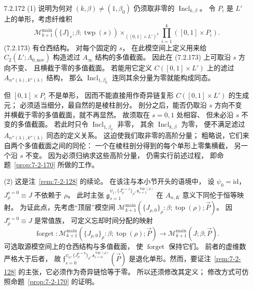 \begin{remark}{7.2.172}\label{rem:7-2-172}
\textup{(1)} 说明为何对
$(k,\beta)\ne(1,\beta_0)$
仍须取非零的 $\operatorname{Incl}_{k,\beta}$。
令 $P_i$ 是 $L'$ 上的单形，考虑纤维积
\begin{equation}
\mathcal M_{k+1}^{\mathrm{main}}
(\{J\}_s;\beta;\operatorname{twp}(s))
\mathbin{\times_{([0,1]\times L')^k}}
\prod_{i=1}^{k}([0,1]\times P_i).
\tag{7.2.173}\label{eq:7-2-173}
\end{equation}
(7.2.173) 有仓西结构。
对每个固定的 $s$，
在此模空间上定义用来给
$C_2(L';\Lambda_{0,\mathrm{nov}})$
构造滤过 $A_\infty$ 结构的多值截面。
因此在 (7.2.173) 上可取沿 $s$ 方向不变、
且横截于零的多值截面。
若能用它定义
$C([0,1]\times L')$ 上的滤过
$A_{n''(\lambda),k''(\lambda)}$ 结构，
那么 $\operatorname{Incl}_{1,\beta_0}$
连同其余分量为零就能构成同态。

但 $[0,1]\times P_i$ 不是单形，
因而不能直接用作奇异链复形
$C([0,1]\times L')$ 的生成元；
必须适当细分，最自然的是棱柱剖分。
剖分之后，能否仍取沿 $s$ 方向不变
并横截于零的多值截面，就不再显然。
故须取在 $s=0,1$ 处相容、
但未必沿 $s$ 不变的多值截面。
若此时只令
$\operatorname{Incl}_{1,\beta_0}$ 非零，
其余 $\operatorname{Incl}_{k,\beta}$ 为零，
便不满足滤过
$A_{n''(\lambda),k''(\lambda)}$ 同态的定义关系。
这迫使我们取非零的高阶分量；
粗略说，它们来自两个多值截面之间的同伦：
一个在棱柱剖分得到的每个单形上零集横截，
另一个沿 $s$ 不变。
因为必须归纳求这些高阶分量，
仍需实行前述过程，
即命题~\ref{prop:7-2-170} 所做的工作。

\textup{(2)} 这是注~\ref{rem:7-2-128} 的续论。
在该注与本小节开头的语境中，
设 $\psi_0=\mathrm{id}$，
$J_\rho^{s=0}\equiv J$ 不依赖于 $\rho$。
此时主张
$\mathfrak g_{s=1}^{\psi_1,\{J_\rho^{s=1}\}_\rho,
\mathfrak s^{\operatorname{top}(\rho)}_{s=1}}$
在 $A_{n,K}$ 意义下同伦于恒等映射。
为证此点，先考虑“顶层”模空间
$\mathcal M_{k+1}^{\mathrm{main}}
(\{J_{\rho,0}\}_\rho:\beta;
\operatorname{top}(\rho);\vec P)$。
因 $J_\rho^{s=0}\equiv J$ 是常值族，
可定义忘却时间分配的映射
\[
\operatorname{forget}\colon
\mathcal M_{k+1}^{\mathrm{main}}
(\{J_{\rho,0}\}_\rho:\beta;
\operatorname{top}(\rho);\vec P)
\longrightarrow
\mathcal M_{k+1}^{\mathrm{main}}(J;\beta;\vec P).
\]
可选取源模空间上的仓西结构与多值截面，
使 $\operatorname{forget}$ 保持它们。
前者的虚维数严格大于后者，
故
$\mathfrak f_{s=0}^{\psi_0,\{J_\rho^{s=0}\}_\rho,
\mathfrak s^{\operatorname{top}(\rho)}_{s=0}}(\vec P)$
是退化单形。然而，要证注~\ref{rem:7-2-128}
的主张，它必须作为奇异链恰等于零。
所以还须修改其定义；
修改方式可仿照命题~\ref{prop:7-2-170} 的证明。


\end{remark}
